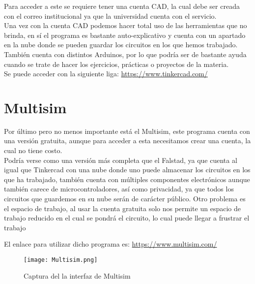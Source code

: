 \documentclass[11pt]{report}
\theoremstyle{plain}
\theoremstyle{definition}
\begin{document}
Para acceder a este se requiere tener una cuenta CAD, la cual debe ser creada con el correo institucional ya que la universidad cuenta con el servicio.\\

Una vez con la cuenta CAD podemos hacer total uso de las herramientas que no brinda, en sí el programa es bastante auto-explicativo y cuenta con un apartado en la nube donde se pueden guardar los circuitos en los que hemos trabajado.\\
También cuenta con distintos Arduinos, por lo que podría ser de bastante ayuda cuando se trate de hacer los ejercicios, prácticas o proyectos de la materia.\\

Se puede acceder con la siguiente liga: \url{https://www.tinkercad.com/}



\section{Multisim}


Por último pero no menos importante está el Multisim, este programa cuenta con una versión gratuita, aunque para acceder a esta necesitamos crear una cuenta, la cual no tiene costo.\\
Podría verse como una versión más completa que el Falstad, ya que cuenta al igual que Tinkercad con una nube donde uno puede almacenar los circuitos en los que ha trabajado, también cuenta con múltiples componentes electrónicos aunque también carece de microcontroladores, así como privacidad, ya que todos los circuitos que guardemos en su nube serán de carácter público. Otro problema es el espacio de trabajo, al usar la cuenta gratuita solo nos permite un espacio de trabajo reducido en el cual se pondrá el circuito, lo cual puede llegar a frustrar el trabajo

El enlace para utilizar dicho programa es: \url{https://www.multisim.com/}

 
\begin{figure}[!h] %
	\centering
	\texttt{[image: Multisim.png]}
	\caption{Captura del la interfaz de Multisim}
	\label{fig:Multisim}
\end{figure}


\nocite{noauthor_circuit_nodate}
\nocite{noauthor_dashboard_nodate}
\nocite{noauthor_multisim_nodate}

\printbibliography


\end{document}
